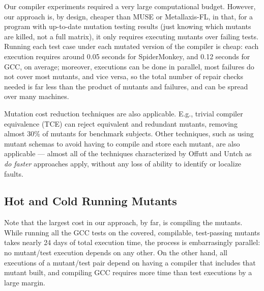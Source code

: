 Our compiler experiments required a very large computational budget.  However, our approach is, by design, cheaper than MUSE or Metallaxis-FL, in that, for a program with up-to-date mutation testing results (just knowing which mutants are killed, not a full matrix), it only requires executing mutants over failing tests.  Running each test case under each mutated version of the compiler is cheap: each execution requires around 0.05 seconds for SpiderMonkey, and 0.12 seconds for GCC, on average; moreover, executions can be done in parallel, most failures do not cover most mutants, and vice versa, so the total number of repair checks needed is far less than the product of mutants and failures, and can be spread over many machines.  

Mutation cost reduction techniques are also applicable.  E.g., trivial compiler equivalence (TCE) \cite{TCE} can reject equivalent and redundant mutants, removing almost 30\% of mutants for benchmark subjects. Other techniques, such as using mutant schemas to avoid having to compile and store each mutant, are also applicable --- almost all of the techniques characterized by Offutt and Untch \cite{offutt2001mutation} as \emph{do faster} approaches apply, without any loss of ability to identify or localize faults.

\subsection{Hot and Cold Running Mutants}

Note that the largest cost in our approach, by far, is compiling the mutants.  While running all the GCC tests on the covered, compilable, test-passing mutants takes nearly 24 days of total execution time, the process is embarrasingly parallel:  no mutant/test execution depends on any other.  On the other hand, all executions of a mutant/test pair depend on having a compiler that includes that mutant built, and compiling GCC requires more time than test executions by a large margin.

